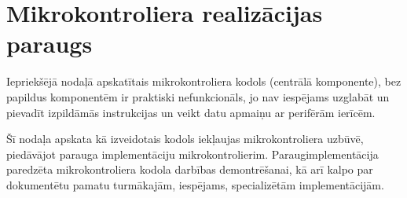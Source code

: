 \section{Mikrokontroliera realizācijas paraugs}
	Iepriekšējā nodaļā apskatītais mikrokontroliera kodols (centrālā
	komponente), bez papildus komponentēm ir praktiski nefunkcionāls, jo
	nav iespējams uzglabāt un pievadīt izpildāmās instrukcijas un veikt
	datu apmaiņu ar perifērām ierīcēm.
	
	
	Šī nodaļa apskata kā izveidotais kodols iekļaujas
	mikrokontroliera uzbūvē, piedāvājot	parauga implementāciju
	mikrokontrolierim. 
	Paraug\-implementācija paredzēta mikrokontroliera kodola 
	darbības demontrēšanai, kā arī kalpo par dokumentētu pamatu 
	turmākajām, iespējams, specializētām implementācijām.
	
	
	 \pagebreak[3]
	
